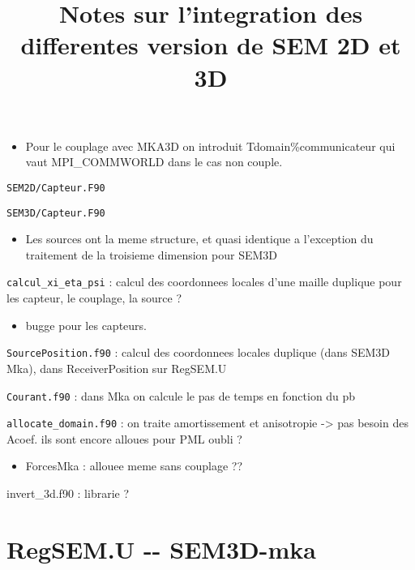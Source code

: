 \documentclass[10pt,a4paper,english]{article}
\title{Notes sur l'integration des differentes version de SEM 2D et 3D}
\author{}
\date{}
\newlength{\locallinewidth}
\begin{document}
\maketitle

\setlength{\locallinewidth}{\linewidth}
\begin{itemize}
\item {} 
Pour le couplage avec MKA3D on introduit Tdomain{\%}communicateur qui vaut MPI{\_}COMMWORLD
dans le cas non couple.

\end{itemize}

\texttt{SEM2D/Capteur.F90}

\texttt{SEM3D/Capteur.F90}
\begin{itemize}
\item {} 
Les sources ont la meme structure, et quasi identique a l'exception du traitement
de la troisieme dimension pour SEM3D

\end{itemize}

\texttt{calcul{\_}xi{\_}eta{\_}psi} : calcul des coordonnees locales d'une maille duplique
pour les capteur, le couplage, la source ?
\begin{itemize}
\item {} 
bugge pour les capteurs.

\end{itemize}

\texttt{SourcePosition.f90} : calcul des coordonnees locales duplique (dans SEM3D Mka),
dans ReceiverPosition sur RegSEM.U

\texttt{Courant.f90} : dans Mka on calcule le pas de temps en fonction du pb

\texttt{allocate{\_}domain.f90} : on traite amortissement et anisotropie -{\textgreater} pas besoin des Acoef.
ils sont encore alloues pour PML oubli ?
\begin{itemize}
\item {} 
ForcesMka : allouee meme sans couplage ??

\end{itemize}

invert{\_}3d.f90 : librarie ?



\hypertarget{regsem-u-sem3d-mka}{}
\section*{RegSEM.U -{}- SEM3D-mka}
\label{regsem-u-sem3d-mka}
\end{document}
